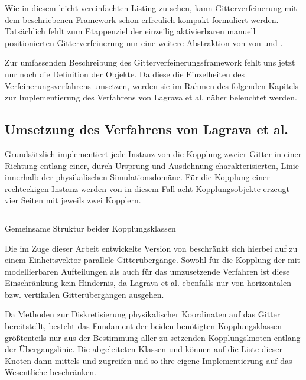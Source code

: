 Wie in diesem leicht vereinfachten Listing zu sehen, kann Gitterverfeinerung mit dem beschriebenen Framework schon erfreulich kompakt formuliert werden. Tatsächlich fehlt zum Etappenziel der einzeilig aktivierbaren manuell positionierten Gitterverfeinerung nur eine weitere Abstraktion von von  und .

\bigskip
Zur umfassenden Beschreibung des Gitterverfeinerungsframework fehlt uns jetzt nur noch die Definition der  Objekte. Da diese die Einzelheiten des Verfeinerungsverfahrens umsetzen, werden sie im Rahmen des folgenden Kapitels zur Implementierung des Verfahrens von Lagrava et al. näher beleuchtet werden.

\newpage
\subsection{Umsetzung des Verfahrens von Lagrava et al.}

Grundsätzlich implementiert jede Instanz von  die Kopplung zweier Gitter in einer Richtung entlang einer, durch Ursprung und Ausdehnung charakterisierten, Linie innerhalb der physikalischen Simulationsdomäne. Für die Kopplung einer rechteckigen  Instanz werden von  in diesem Fall acht Kopplungsobjekte erzeugt -- vier Seiten mit jeweils zwei Kopplern.

\begin{listing}[H]
\inputminted{cpp}{code/coupler2d.cpp}
\caption{Gemeinsame Struktur beider Kopplungsklassen}
\label{lst:Coupler2D}
\end{listing}

Die im Zuge dieser Arbeit entwickelte Version von  beschränkt sich hierbei auf zu einem Einheitsvektor parallele Gitterübergänge. Sowohl für die Kopplung der mit  modellierbaren Aufteilungen als auch für das umzusetzende Verfahren ist diese Einschränkung kein Hindernis, da Lagrava et al. ebenfalls nur von horizontalen bzw. vertikalen Gitterübergängen ausgehen.

Da  Methoden zur Diskretisierung physikalischer Koordinaten auf das Gitter bereitstellt, besteht das Fundament der beiden benötigten Kopplungsklassen größtenteils nur aus der Bestimmung aller zu setzenden Kopplungsknoten entlang der Übergangslinie. Die abgeleiteten Klassen  und  können auf die Liste dieser Knoten dann mittels  und  zugreifen und so ihre eigene Implementierung auf das Wesentliche beschränken.

